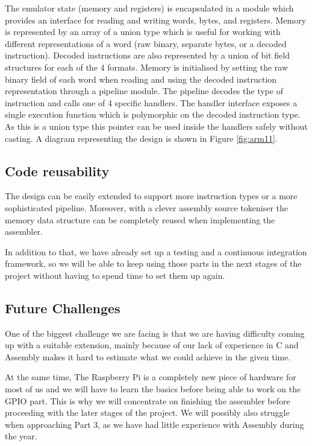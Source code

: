 \documentclass[11pt]{article}
\begin{document}
The emulator state (memory and registers) is encapsulated in a module which provides an interface for reading and writing words, bytes, and registers. Memory is represented by an array of a union type which is useful for working with different representations of a word (raw binary, separate bytes, or a decoded instruction). Decoded instructions are also represented by a union of bit field structures for each of the 4 formats. Memory is initialised by setting the raw binary field of each word when reading and using the decoded instruction representation through a pipeline module. The pipeline decodes the type of instruction and calls one of 4 specific handlers. The handler interface exposes a single execution function which is polymorphic on the decoded instruction type.  As this is a union type this pointer can be used inside the handlers safely without casting.
A diagram representing the design is shown in Figure \ref{fig:arm11}.

\subsection{Code reusability}

The design can be easily extended to support more instruction types or a more sophisticated pipeline. Moreover, with a clever assembly source tokeniser the memory data structure can be completely reused when implementing the assembler.

In addition to that, we have already set up a testing and a continuous integration framework, so we will be able to keep using those parts in the next stages of the project without having to spend time to set them up again. 

\subsection{Future Challenges}

One of the biggest challenge we are facing is that we are having difficulty coming up with a suitable extension, mainly because of our lack of experience in C and Assembly makes it hard to estimate what we could achieve in the given time. 

At the same time, The Raspberry Pi is a completely new piece of hardware for most of us and we will have to learn the basics before being able to work on the GPIO part. This is why we will concentrate on finishing the assembler before proceeding with the later stages of the project.
We will possibly also struggle when approaching Part 3, as we have had little experience with Assembly during the year.
\end{document}
